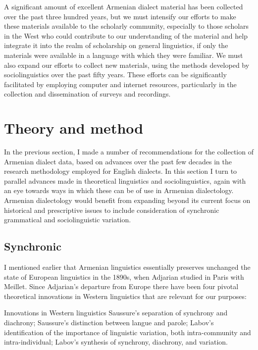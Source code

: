 \documentclass[output=paper]{langscibook}
\begin{document}
A significant amount of excellent Armenian dialect material has been collected over the past three hundred years, but we must intensify our efforts to make these materials available to the scholarly community, especially to those scholars in the West who could contribute to our understanding of the material and help integrate it into the realm of scholarship on general linguistics, if only the materials were available in a language with which they were familiar. We must also expand our efforts to collect new materials, using the methods developed by sociolinguistics over the past fifty years. These efforts can be significantly facilitated by employing computer and internet resources, particularly in the collection and dissemination of surveys and recordings.

\section{Theory and method}\label{sec:vaux:theory}

In the previous section, I made a number of recommendations for the collection of Armenian dialect data, based on advances over the past few decades in the research methodology employed for English dialects. In this section I turn to parallel advances made in theoretical linguistics and sociolinguistics, again with an eye towards ways in which these can be of use in Armenian dialectology. Armenian dialectology would benefit from expanding beyond its current focus on historical and prescriptive issues to include consideration of synchronic grammatical and sociolinguistic variation.

\subsection{Synchronic}\label{sec:vaux:theory:sync}

I mentioned earlier that Armenian linguistics essentially preserves unchanged the state of European linguistics in the 1890s, when Adjarian studied in Paris with Meillet. Since Adjarian's departure from Europe there have been four pivotal theoretical innovations in Western linguistics that are relevant for our purposes: 

\ea Innovations in Western linguistics
\ea  Saussure's separation of synchrony and diachrony;
\ex  Saussure's distinction between langue and parole;
\ex  Labov's identification of the importance of linguistic variation, both intra-community and intra-individual;
\ex  Labov's synthesis of synchrony, diachrony, and variation.
\z
\z
\end{document}
